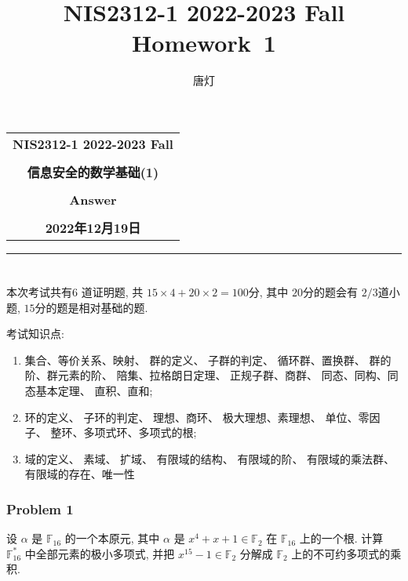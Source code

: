 \documentclass[a4paper,12pt]{ctexart}
\title{NIS2312-1 2022-2023 Fall Homework~1}
\author{唐灯}
\begin{document}
  \begin{center}

  \vspace{-0.3in}
  \begin{tabular}{c}
    \textbf{\Large NIS2312-1 2022-2023 Fall} \\
    \textbf{\Large  } \\
    \textbf{\Large  信息安全的数学基础(1)} \\
    \textbf{\Large  } \\
    \textbf{\Large  Answer} \\
    \textbf{\Large  } \\
    \textbf{\Large 2022年12月19日} \\
  \end{tabular}
  \end{center}
  \noindent
  \rule{\linewidth}{0.4pt}
  

\section{}
    本次考试共有$ 6 $ 道证明题, 共 $ 15\times 4+20\times 2=100 $分, 其中 $ 20 $分的题会有 $ 2/3 $道小题, $ 15 $分的题是相对基础的题.

    考试知识点:
    \begin{enumerate}[label=(\arabic{*})]
      \item 集合、等价关系、映射、
      群的定义、
      子群的判定、
      循环群、置换群、
      群的阶、群元素的阶、
      陪集、拉格朗日定理、
      正规子群、商群、
      同态、同构、同态基本定理、
      直积、直和;
      \item 环的定义、
      子环的判定、
      理想、商环、
      极大理想、素理想、
      单位、零因子、
      整环、多项式环、多项式的根;
      \item 域的定义、
      素域、
      扩域、
      有限域的结构、
      有限域的阶、
      有限域的乘法群、
      有限域的存在、唯一性
      
    \end{enumerate}
      
      \subsubsection*{Problem 1}
    设 $\alpha$ 是 $\mathbb{F}_{16}$ 的一个本原元, 其中 $\alpha$ 是 $x^4+x+1\in \mathbb{F}_2$ 在 $\mathbb{F}_{16}$ 上的一个根.
    计算 $\mathbb{F}_{16}^*$ 中全部元素的极小多项式, 并把 $x^{15}-1\in \mathbb{F}_2$ 分解成 $\mathbb{F}_2$ 上的不可约多项式的乘积.
\end{document}
